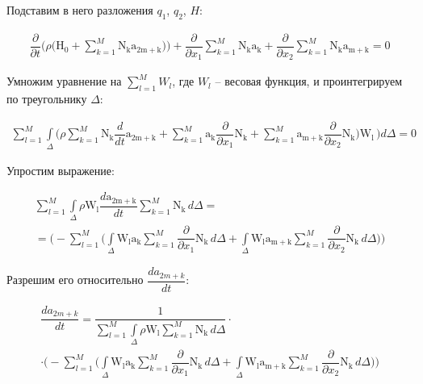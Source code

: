 \documentclass[14pt]{extreport}
\begin{document}
Подставим в него разложения $q_1$, $q_2$, $H$:

\begin{multline*}
\dfrac{\partial}{\partial t}\bigg(\rho \bigg(\operatorname{H_{0}}+ \sum_{k=1}^{M} \operatorname{N_{k}} \operatorname{a_{2m+k}}\bigg)\bigg)+\dfrac{\partial}{\partial x_{1}} \sum_{k=1}^{M} \operatorname{N_{k}} \operatorname{a_{k}} + \dfrac{\partial}{\partial x_{2}} \sum_{k=1}^{M} \operatorname{N_{k}} \operatorname{a_{m+k}}=0
\end{multline*}

Умножим уравнение на $\sum\limits_{l=1}^{M} W_l$, где $W_l$ -- весовая функция, и проинтегрируем по треугольнику $\Delta$:

\begin{multline*}
\sum_{l=1}^{M} \int\limits_{\Delta} \bigg(\rho \sum_{k=1}^{M} \operatorname{N_{k}} \dfrac{d}{d t} \operatorname{a_{2m+k}} + \sum_{k=1}^{M} \operatorname{a_{k}} \dfrac{\partial}{\partial x_{1}} \operatorname{N_{k}} + \sum_{k=1}^{M} \operatorname{a_{m+k}} \dfrac{\partial}{\partial x_{2}} \operatorname{N_{k}}\bigg) \operatorname{W_{l}}\, \bigg)d\Delta=0
\end{multline*}

Упростим выражение:

\begin{multline*}
\sum_{l=1}^{M} \int\limits_{\Delta} \rho \operatorname{W_{l}} \dfrac{d\operatorname{a_{2m+k}}}{d t} \sum_{k=1}^{M} \operatorname{N_{k}}\, d\Delta = \\ =\bigg ( - \sum_{l=1}^{M} \bigg(\int\limits_{\Delta} \operatorname{W_{l}} \operatorname{a_{k}} \sum_{k=1}^{M} \dfrac{\partial}{\partial x_{1}} \operatorname{N_{k}}\, d\Delta + \int\limits_{\Delta} \operatorname{W_{l}} \operatorname{a_{m+k}} \sum_{k=1}^{M} \dfrac{\partial}{\partial x_{2}} \operatorname{N_{k}}\, d\Delta\bigg)\bigg )
\end{multline*}

Разрешим его относительно $\dfrac{da_{2m+k}}{dt}$:

\begin{multline*}
\dfrac{da_{2m+k}}{dt}= \dfrac{1}{\sum\limits_{l=1}^{M} \int\limits_{\Delta} \rho \operatorname{W_{l}}  \sum\limits_{k=1}^{M} \operatorname{N_{k}}\, d\Delta} \cdot \\ \cdot \bigg ( - \sum_{l=1}^{M} \bigg(\int\limits_{\Delta} \operatorname{W_{l}} \operatorname{a_{k}} \sum\limits_{k=1}^{M} \dfrac{\partial}{\partial x_{1}} \operatorname{N_{k}}\, d\Delta + \int\limits_{\Delta} \operatorname{W_{l}} \operatorname{a_{m+k}} \sum_{k=1}^{M} \dfrac{\partial}{\partial x_{2}} \operatorname{N_{k}}\, d\Delta\bigg)\bigg )
\end{multline*}
\end{document}
